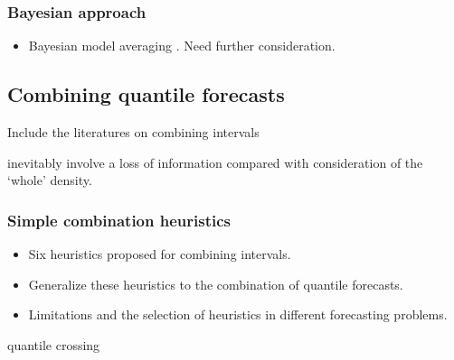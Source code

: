 \documentclass[11pt]{article}
\begin{document}
\subsubsection{Bayesian approach}
\label{sec:bayesian_approach}

\begin{itemize}
  \item Bayesian model averaging \citep{Raftery1997-ij}. Need further consideration.
\end{itemize}






\subsection{Combining quantile forecasts}
\label{sec:combining_quantile_forecasts}

Include the literatures on combining intervals \citep[e.g.,][]{Wallis2005-yf,Lichtendahl2013-rt,Park2015-zn,Gaba2017-om,Grushka-Cockayne2017-dj,Grushka-Cockayne2020-qv}

inevitably involve a loss of information compared
with consideration of the `whole' density.

\subsubsection{Simple combination heuristics}
\label{sec:simple_combination_heuristics}
\begin{itemize}
  \item Six heuristics \citep{Park2015-zn,Gaba2017-om,Grushka-Cockayne2020-qv} proposed for combining intervals.
  \item Generalize these heuristics to the combination of quantile forecasts.
  \item Limitations and the selection of heuristics in different forecasting problems.
\end{itemize}

quantile crossing

\end{document}
